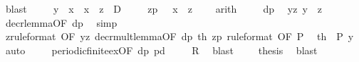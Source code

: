 \begin{isabellebody}
\ blast\isanewline
\ \ \ \isamarkupfalse%
\ {\isacharquery}{\kern0pt}y\ {\isacharequal}{\kern0pt}\ {\isachardoublequoteopen}x\ {\isacharminus}{\kern0pt}\ {\isacharparenleft}{\kern0pt}{\isasymbar}x\ {\isacharminus}{\kern0pt}\ z{\isasymbar}\ {\isacharplus}{\kern0pt}\ {}{\isacharparenright}{\kern0pt}{\isacharasterisk}{\kern0pt}D{\isachardoublequoteclose}\isanewline
\ \ \ \isamarkupfalse%
\ zp{\isacharcolon}{\kern0pt}\ {\isachardoublequoteopen}{}\ {\isacharless}{\kern0pt}{\isacharequal}{\kern0pt}\ {\isacharparenleft}{\kern0pt}{\isasymbar}x\ {\isacharminus}{\kern0pt}\ z{\isasymbar}\ {\isacharplus}{\kern0pt}\ {}{\isacharparenright}{\kern0pt}{\isachardoublequoteclose}\ \isamarkupfalse%
\ arith\isanewline
\ \ \ \isamarkupfalse%
\ dp\ \isamarkupfalse%
\ yz{\isacharcolon}{\kern0pt}\ {\isachardoublequoteopen}{\isacharquery}{\kern0pt}y\ {\isacharless}{\kern0pt}\ z{\isachardoublequoteclose}\ \isamarkupfalse%
\ decr{\isacharunderscore}{\kern0pt}lemma{\isacharbrackleft}{\kern0pt}OF\ dp{\isacharbrackright}{\kern0pt}\ \isamarkupfalse%
\ simp\ \ \ \isanewline
\ \ \ \isamarkupfalse%
\ z{\isacharbrackleft}{\kern0pt}rule{\isacharunderscore}{\kern0pt}format{\isacharcomma}{\kern0pt}\ OF\ yz{\isacharbrackright}{\kern0pt}\ decr{\isacharunderscore}{\kern0pt}mult{\isacharunderscore}{\kern0pt}lemma{\isacharbrackleft}{\kern0pt}OF\ dp\ th\ zp{\isacharcomma}{\kern0pt}\ rule{\isacharunderscore}{\kern0pt}format{\isacharcomma}{\kern0pt}\ OF\ P{\isacharbrackright}{\kern0pt}\ \isamarkupfalse%
\ th{}{\isacharcolon}{\kern0pt}\ {\isachardoublequoteopen}\ P{\isacharprime}{\kern0pt}\ {\isacharquery}{\kern0pt}y{\isachardoublequoteclose}\ \isamarkupfalse%
\ auto\isanewline
\ \ \ \isamarkupfalse%
\ periodic{\isacharunderscore}{\kern0pt}finite{\isacharunderscore}{\kern0pt}ex{\isacharbrackleft}{\kern0pt}OF\ dp\ pd{\isacharbrackright}{\kern0pt}\isanewline
\ \ \ \isamarkupfalse%
\ {\isachardoublequoteopen}{\isacharquery}{\kern0pt}R{}{\isachardoublequoteclose}\ \isamarkupfalse%
\ blast\isacommand{{\isacharbraceright}{\kern0pt}}\isamarkupfalse%
\isanewline
\ \isamarkupfalse%
\ \isamarkupfalse%
\ {\isacharquery}{\kern0pt}thesis\ \isamarkupfalse%
\ blast\isanewline
{}\isamarkupfalse%
%
\endisatagproof
{\isafoldproof}%
%
\isadelimproof
%
\endisadelimproof
%
\isadelimdocument

\end{isabellebody}
